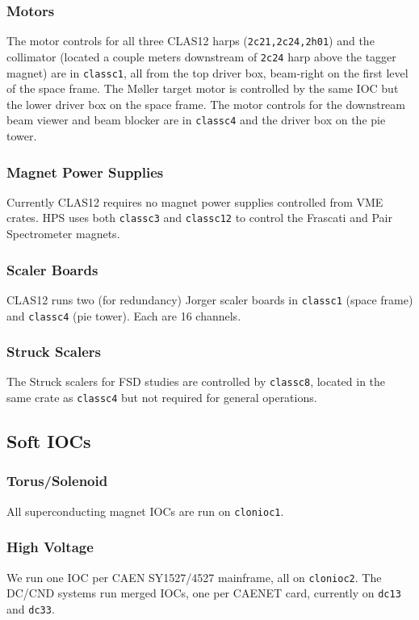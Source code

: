 \documentclass[amsmath,amssymb,notitlepage,11pt]{revtex4}
\begin{document}
\subsubsection{Motors}
The motor controls for all three CLAS12 harps (\texttt{2c21,2c24,2h01}) and the collimator (located a couple meters downstream of \texttt{2c24} harp above the tagger magnet) are in \texttt{classc1}, all from the top driver box, beam-right on the first level of the space frame.  The M{\o}ller target motor is controlled by the same IOC but the lower driver box on the space frame.  The motor controls for the downstream beam viewer and beam blocker are in \texttt{classc4} and the driver box on the pie tower. 
\subsubsection{Magnet Power Supplies}
Currently CLAS12 requires no magnet power supplies controlled from VME crates.  HPS uses both \texttt{classc3} and \texttt{classc12} to control the Frascati and Pair Spectrometer magnets.
\subsubsection{Scaler Boards}
CLAS12 runs two (for redundancy) Jorger scaler boards in \texttt{classc1} (space frame) and \texttt{classc4} (pie tower).  Each are 16 channels.
\subsubsection{Struck Scalers}
The Struck scalers for FSD studies are controlled by \texttt{classc8}, located in the same crate as \texttt{classc4} but not required for general operations.

\subsection{Soft IOCs}
\subsubsection{Torus/Solenoid}
All superconducting magnet IOCs are run on \texttt{clonioc1}.
\subsubsection{High Voltage}
We run one IOC per CAEN SY1527/4527 mainframe, all on \texttt{clonioc2}.  The DC/CND systems run merged IOCs, one per CAENET card, currently on \texttt{dc13} and \texttt{dc33}.
\end{document}
